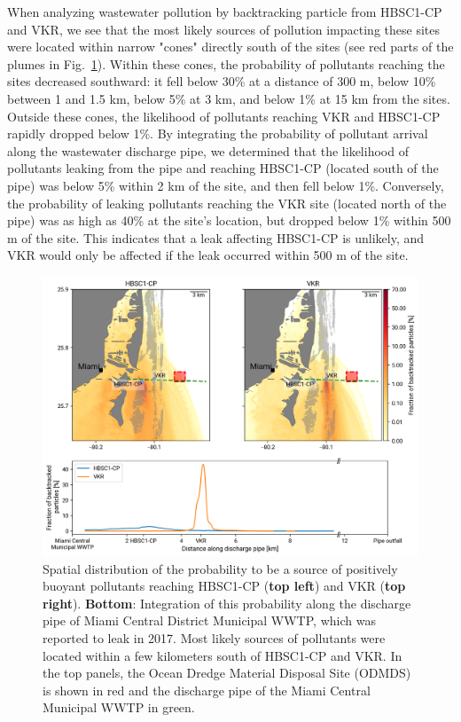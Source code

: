 \documentclass[preprint,12pt,authoryear]{elsarticle}
\begin{document}
When analyzing wastewater pollution by backtracking particle from HBSC1-CP and VKR, we see that the most likely sources of pollution impacting these sites were located within narrow "cones" directly south of the sites (see red parts of the plumes in Fig.~\ref{fig:backtrack}). Within these cones, the probability of pollutants reaching the sites decreased southward: it fell below 30\% at a distance of 300 m, below 10\% between 1 and 1.5 km, below 5\% at 3 km, and below 1\% at 15 km from the sites. Outside these cones, the likelihood of pollutants reaching VKR and HBSC1-CP rapidly dropped below 1\%. By integrating the probability of pollutant arrival along the wastewater discharge pipe, we determined that the likelihood of pollutants leaking from the pipe and reaching HBSC1-CP (located south of the pipe) was below 5\% within 2 km of the site, and then fell below 1\%. Conversely, the probability of leaking pollutants reaching the VKR site (located north of the pipe) was as high as 40\% at the site's location, but dropped below 1\% within 500 m of the site. This indicates that a leak affecting HBSC1-CP is unlikely, and VKR would only be affected if the leak occurred within 500 m of the site.

\begin{figure}
    \centering
    \includegraphics[width=.98\textwidth]{figures/fig_proba_stokes_v2.png}
    \caption{Spatial distribution of the probability to be a source of positively buoyant pollutants reaching HBSC1-CP (\textbf{top left}) and VKR (\textbf{top right}). \textbf{Bottom}: Integration of this probability along the discharge pipe of Miami Central District Municipal WWTP, which was reported to leak in 2017. Most likely sources of pollutants were located within a few kilometers south of HBSC1-CP and VKR. In the top panels, the Ocean Dredge Material Disposal Site (ODMDS) is shown in red and the discharge pipe of the Miami Central Municipal WWTP in green.}
    \label{fig:backtrack}
\end{figure}
\end{document}
